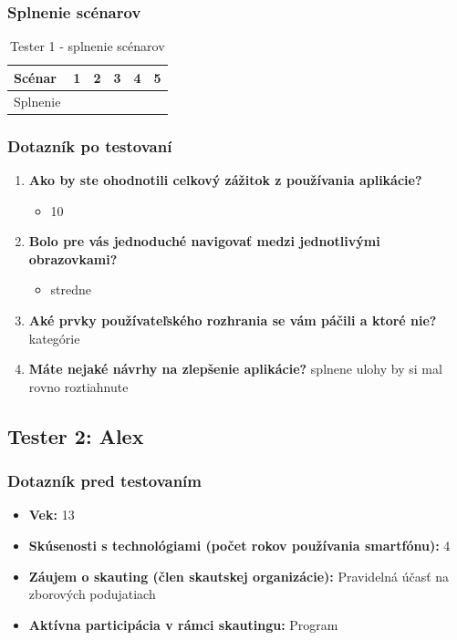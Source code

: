 \subsubsection*{Splnenie scénarov}
\begin{table}[h!]
    \centering
    \begin{tabular}{|l|p{1.5cm}|p{1.5cm}|p{1.5cm}|p{1.5cm}|p{1.5cm}|}
        \hline
        Scénar & 1 & 2 & 3 & 4 & 5 \\ \hline
        Splnenie & & & & & \\ \hline
    \end{tabular}
    \caption{Tester 1 - splnenie scénarov}
\end{table}

\subsubsection*{Dotazník po testovaní}
\begin{enumerate}[leftmargin=*]
    \item \textbf{Ako by ste ohodnotili celkový zážitok z používania aplikácie?}
    \begin{itemize}
        \item 10
    \end{itemize}
    \item \textbf{Bolo pre vás jednoduché navigovať medzi jednotlivými obrazovkami?}
    \begin{itemize}
        \item stredne
    \end{itemize}
    \item \textbf{Aké prvky používateľského rozhrania se vám páčili a ktoré nie?} kategórie
    \item \textbf{Máte nejaké návrhy na zlepšenie aplikácie?} splnene ulohy by si mal rovno roztiahnute
\end{enumerate}

\subsection*{Tester 2: Alex}
\subsubsection*{Dotazník pred testovaním}
\begin{itemize}[leftmargin=*]
    \item \textbf{Vek:} 13
    \item \textbf{Skúsenosti s technológiami (počet rokov používania smartfónu):} 4
    \item \textbf{Záujem o skauting (člen skautskej organizácie):} Pravidelná účasť na zborových podujatiach
    \item \textbf{Aktívna participácia v rámci skautingu:} Program
\end{itemize}

